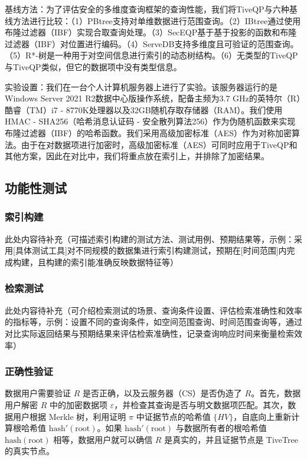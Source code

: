 \documentclass{cumcmthesis}
\numberwithin{equation}{section} %
\numberwithin{figure}{section} %
\numberwithin{table}{section} %
\begin{document}
基线方法：为了评估安全的多维度查询框架的查询性能，我们将TiveQP与六种基线方法进行比较：（1）PBtree\cite{文献5}支持对单维数据进行范围查询。（2）IBtree\cite{文献6}通过使用布隆过滤器（IBF）实现合取查询处理。（3）SecEQP\cite{文献7}基于基于投影的函数和布隆过滤器（IBF）对位置进行编码。（4）ServeDB\cite{文献8}支持多维度且可验证的范围查询。（5）R*-树\cite{文献9}是一种用于对空间信息进行索引的动态树结构。（6）无类型的TiveQP与TiveQP类似，但它的数据项中没有类型信息。

实验设置：我们在一台个人计算机服务器上进行了实验。该服务器运行的是Windows Server 2021 R2数据中心版操作系统，配备主频为3.7 GHz的英特尔（R）酷睿（TM）i7 - 8770K处理器以及32GB随机存取存储器（RAM）。我们使用HMAC - SHA256（哈希消息认证码 - 安全散列算法256）作为伪随机函数来实现布隆过滤器（IBF）的哈希函数。我们采用高级加密标准（AES）作为对称加密算法。由于在对数据项进行加密时，高级加密标准（AES）可同时应用于TiveQP和其他方案，因此在对比中，我们将重点放在索引上，并排除了加密结果。

\subsection{功能性测试}

\subsubsection{索引构建}
此处内容待补充（可描述索引构建的测试方法、测试用例、预期结果等，示例：采用[具体测试工具]对不同规模的数据集进行索引构建测试，预期在[时间范围]内完成构建，且构建的索引能准确反映数据特征等）

\subsubsection{检索测试}
此处内容待补充（可介绍检索测试的场景、查询条件设置、评估检索准确性和效率的指标等，示例：设置不同的查询条件，如空间范围查询、时间范围查询等，通过对比实际返回结果与预期结果来评估检索准确性，记录查询响应时间来衡量检索效率）

\subsubsection{正确性验证}
数据用户需要验证 $R$ 是否正确，以及云服务器（CS）是否伪造了 $R$。首先，数据用户解密 $R$ 中的加密数据项 $\varepsilon$，并检查其查询是否与明文数据项匹配。其次，数据用户根据 Merkle 树\cite{30}，利用证明 $\pi$ 中证据节点的哈希值 $\{HV\}$，自底向上重新计算根哈希值 $\text{hash}'(\text{root})$。如果 $\text{hash}'(\text{root})$ 与数据所有者的根哈希值 $\text{hash}(\text{root})$ 相等，数据用户就可以确信 $R$ 是真实的，并且证据节点是 TiveTree 的真实节点。
\end{document}
